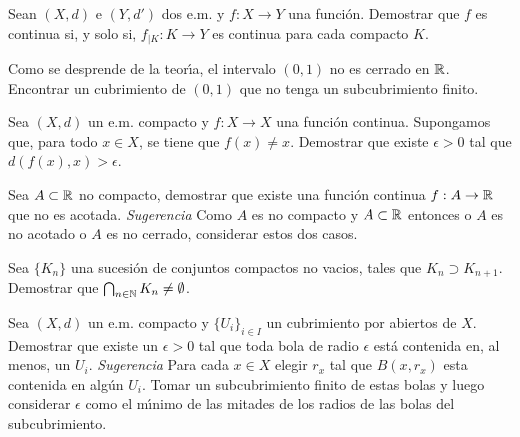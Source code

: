 \begin{ejercicio} Sean $(X,d)$ e $(Y,d')$ dos e.m. y $f:X\to Y$
una funci\'on. Demostrar que $f$ es continua si, y solo si,
$f_{|K}:K\to Y$ es continua para cada compacto $K$.
\end{ejercicio}


\begin{ejercicio} Como se desprende de la teor\'{\i}a, el intervalo
$(0,1)$ no es cerrado en $\rr$. Encontrar un cubrimiento de
$(0,1)$ que no tenga un subcubrimiento finito.
\end{ejercicio}

\begin{ejercicio} Sea $(X,d)$ un e.m. compacto y $f:X\to X$ una
funci\'on continua. Supongamos que, para todo $x\in X$, se tiene
que $f(x)\neq x$. Demostrar que existe $\epsilon>0$ tal que
$d(f(x),x)>\epsilon$.
\end{ejercicio}

\begin{ejercicio} Sea $A\subset\rr$ no compacto, demostrar que
existe una funci\'on continua $f:A\to\rr$ que no es acotada.
\emph{Sugerencia} Como $A$ es no compacto y $A\subset \rr$
entonces o $A$ es no acotado o $A$ es no cerrado, considerar estos
dos casos.
\end{ejercicio}


\begin{ejercicio} Sea $\{K_n\}$ una sucesi\'on de conjuntos
compactos no vacios, tales que $K_n\supset K_{n+1}$. Demostrar que
$\bigcap_{n\in\nn}K_n\neq\emptyset$.
\end{ejercicio}

\begin{ejercicio} Sea $(X,d)$ un e.m. compacto y $\{U_i\}_{i\in
I}$ un cubrimiento por abiertos de $X$. Demostrar que existe un
$\epsilon>0$ tal que toda bola de radio $\epsilon$ est\'a
contenida en, al menos, un $U_i$. \emph{Sugerencia} Para cada
$x\in X$ elegir $r_x$ tal que $B(x,r_x)$ esta contenida en alg\'un
$U_i$. Tomar un subcubrimiento finito de estas bolas y luego
considerar $\epsilon$ como el m\'{\i}nimo de las mitades de los
radios de las bolas del subcubrimiento.
\end{ejercicio}

